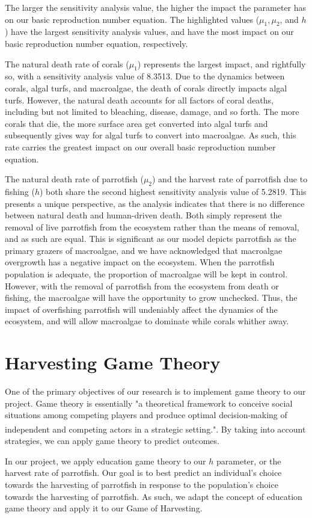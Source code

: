\documentclass[12pt]{article}
\begin{document}
    The larger the sensitivity analysis value, the higher the impact the parameter has on our basic reproduction number equation. The highlighted values ($\mu_{1}, \mu_{2}$, and $h$) have the largest sensitivity analysis values, and have the most impact on our basic reproduction number equation, respectively. \par
    The natural death rate of corals ($\mu_{1}$) represents the largest impact, and rightfully so, with a sensitivity analysis value of 8.3513. Due to the dynamics between corals, algal turfs, and macroalgae, the death of corals directly impacts algal turfs. However, the natural death accounts for all factors of coral deaths, including but not limited to bleaching, disease, damage, and so forth. The more corals that die, the more surface area get converted into algal turfs and subsequently gives way for algal turfs to convert into macroalgae. As such, this rate carries the greatest impact on our overall basic reproduction number equation. \par
    The natural death rate of parrotfish ($\mu_{2}$) and the harvest rate of parrotfish due to fishing ($h$) both share the second highest sensitivity analysis value of 5.2819. This presents a unique perspective, as the analysis indicates that there is no difference between natural death and human-driven death. Both simply represent the removal of live parrotfish from the ecosystem rather than the means of removal, and as such are equal. This is significant as our model depicts parrotfish as the primary grazers of macroalgae, and we have acknowledged that macroalgae overgrowth has a negative impact on the ecosystem. When the parrotfish population is adequate, the proportion of macroalgae will be kept in control. However, with the removal of parrotfish from the ecosystem from death or fishing, the macroalgae will have the opportunity to grow unchecked. Thus, the impact of overfishing parrotfish will undeniably affect the dynamics of the ecosystem, and will allow macroalgae to dominate while corals whither away.
    
\section{Harvesting Game Theory}
One of the primary objectives of our research is to implement game theory to our project. Game theory is essentially "a theoretical framework to conceive social situations among competing players and produce optimal decision-making of independent and competing actors in a strategic setting."\textsuperscript{\cite{game_theory_definition}}. By taking into account strategies, we can apply game theory to predict outcomes. \par
In our project, we apply education game theory to our $h$ parameter, or the harvest rate of parrotfish. Our goal is to best predict an individual's choice towards the harvesting of parrotfish in response to the population's choice towards the harvesting of parrotfish. As such, we adapt the concept of education game theory and apply it to our Game of Harvesting. 
\end{document}
